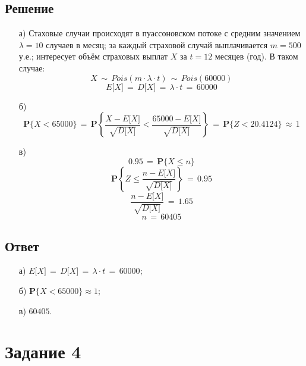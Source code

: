 \documentclass{article}
\begin{document}
\subsection*{Решение}
\begin{enumerate}
\item[а)] Стаховые случаи происходят в пуассоновском потоке с средним значением $ \lambda \! = \! 10 $ случаев в месяц; за каждый страховой случай выплачивается $ m \! = \! 500 $ у.е.; интересует объём страховых выплат $ X $ за $ t \! = \! 12 $ месяцев (год). В таком случае: 
\[ X \, \sim \, Pois(m \! \cdot \! \lambda \! \cdot \! t) \, \sim \, Pois(60000) \]
\[ E \big[ X \big] \, = \, D \big[ X \big] \, = \, \lambda \! \cdot \! t \, = \, 60000 \]
\item[б)]
\[ \mathbf{P} \big\{ X \! < \! 65000 \big\} \, = \, \mathbf{P} \left\{ \dfrac{X \! - \! E \big[ X \big]}{\sqrt{D \big[ X \big]}} \! < \! \dfrac{65000 \! - \! E \big[ X \big]}{\sqrt{D \big[ X \big]}} \right\} \, = \, \mathbf{P} \big\{ Z \! < \! 20.4124 \big\} \, \approx \, 1 \]
\item[в)]
\[ 0.95 \, = \, \mathbf{P} \big\{ X \! \leqslant \! n \big\} \]
\[ \mathbf{P} \left\{ Z \! \leqslant \! \dfrac{n \! - \! E \big[ X \big]}{\sqrt{D \big[X \big]}} \right\} \, = \, 0.95 \]
\[ \dfrac{n \! - \! E \big[ X \big]}{\sqrt{D \big[X \big]}} \, = \, 1.65 \]
\[ n \, = \, 60405 \]
\end{enumerate}
\subsection*{Ответ}
\begin{enumerate}
\item[а)] $ E \big[ X \big] \, = \, D \big[ X \big] \, = \, \lambda \! \cdot \! t \, = \, 60000 $;
\item[б)] $ \mathbf{P} \big\{ X < 65000 \big\} \! \approx \! 1 $;
\item[в)] $ 60405 $.
\end{enumerate}
\section*{Задание 4}
\end{document}
